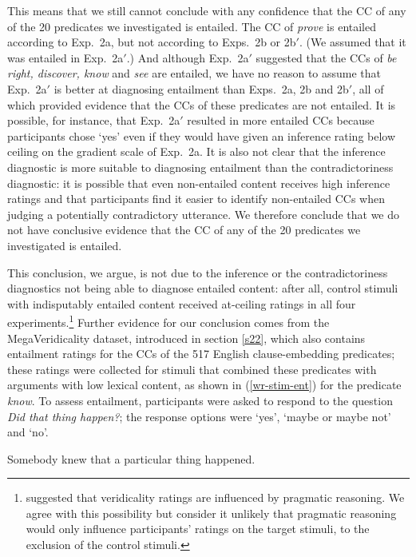 \documentclass[11pt,fleqn]{article}
\newcommand{\6}{\mbox{$[\hspace*{-.6mm}[$}}
\newcommand{\9}{\mbox{$]\hspace*{-.6mm}]$}}
\begin{document}
{This means that we still cannot conclude with any confidence that the CC of any of the 20 predicates we investigated is entailed. The CC of {\em prove} is entailed according to Exp.~2a, but not according to Exps.~2b or 2b$'$. (We assumed that it was entailed in Exp.~2a$'$.) And although Exp.~2a$'$ suggested that the CCs of {\em be right, discover, know} and {\em see} are entailed, we have no reason to assume that Exp.~2a$'$ is better at diagnosing entailment than Exps.~2a, 2b and 2b$'$, all of which provided evidence that the CCs of these predicates are not entailed. It is possible, for instance, that Exp.~2a$'$ resulted in more entailed CCs because participants chose `yes' even if they would have given an inference rating below ceiling on the gradient scale of Exp.~2a. It is also not clear that the inference diagnostic is more suitable to diagnosing entailment than the contradictoriness diagnostic: it is possible that even non-entailed content receives high inference ratings and that participants find it easier to identify non-entailed CCs when judging a potentially contradictory utterance. We therefore conclude that we do not have conclusive evidence that the CC of any of the 20 predicates we investigated is entailed.

This conclusion, we argue, is not due to the inference or the contradictoriness diagnostics not being able to diagnose entailed content: after all, control stimuli with indisputably entailed content received at-ceiling ratings in all four experiments.\footnote{\citet[329]{demarneffe-etal2012} suggested that veridicality ratings are influenced by pragmatic reasoning. We agree with this possibility but consider it unlikely that pragmatic reasoning would only influence participants' ratings on the target stimuli, to the exclusion of the control stimuli.} Further evidence for our conclusion comes from the MegaVeridicality dataset, introduced in section \ref{s22}, which also contains entailment ratings for the CCs of the 517 English clause-embedding predicates; these ratings were collected for stimuli that combined these predicates with arguments with low lexical content, as shown in (\ref{wr-stim-ent}) for the predicate {\em know}. To assess entailment, participants were asked to respond to the question {\em Did that thing happen?}; the response options were `yes', `maybe or maybe not' and `no'. 

\begin{exe}
\ex\label{wr-stim-ent} Somebody knew that a particular thing happened.
\end{exe}

}
\end{document}
